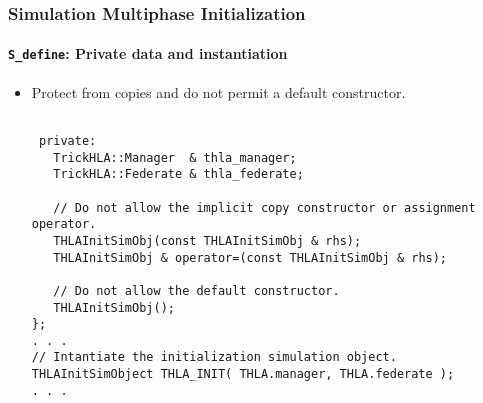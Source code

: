    \begin{frame}[fragile]
      \frametitle{Simulation Multiphase Initialization}
      \framesubtitle{\texttt{S\_define}: Private data and instantiation}
      \begin{itemize}
         \item Protect from copies and do not permit a default constructor.
\begin{Verbatim}[frame=single, fontsize=\tiny]
      
 private:
   TrickHLA::Manager  & thla_manager;
   TrickHLA::Federate & thla_federate;
 
   // Do not allow the implicit copy constructor or assignment operator.
   THLAInitSimObj(const THLAInitSimObj & rhs);
   THLAInitSimObj & operator=(const THLAInitSimObj & rhs);
   
   // Do not allow the default constructor.
   THLAInitSimObj();
};
. . .
// Intantiate the initialization simulation object.
THLAInitSimObject THLA_INIT( THLA.manager, THLA.federate );
. . .
\end{Verbatim}
      \end {itemize}
   \end{frame}
